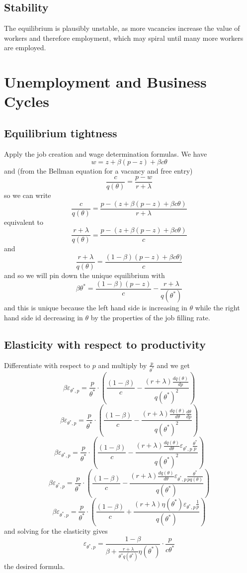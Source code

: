 \documentclass[11pt]{amsart}
\begin{document}
\subsection{Stability}

The equilibrium is plausibly unstable, as more vacancies increase the value of workers and therefore employment, which may spiral until many more workers are employed.

\section{Unemployment and Business Cycles}

\subsection{Equilibrium tightness}

Apply the job creation and wage determination formulas.
We have
\[
w = z + \beta (p-z) + \beta c \theta
\]
and (from the Bellman equation for a vacancy and free entry)
\[
\frac{c}{q(\theta)} = \frac{p - w}{r + \lambda}
\]
so we can write 
\[
\frac{c}{q(\theta)} = \frac{p - (z + \beta (p-z) + \beta c \theta)}{r + \lambda}
\]
equivalent to 
\[
\frac{r + \lambda}{q(\theta)} = \frac{p - (z + \beta (p-z) + \beta c \theta)}{c}
\]
and
\[
\frac{r + \lambda}{q(\theta)} = \frac{(1-\beta)(p-z) + \beta c \theta)}{c}
\]
and so we will pin down the unique equilibrium with
\[
\beta \theta^* = \frac{(1-\beta)(p-z)}{c} - \frac{r + \lambda}{q(\theta^*)}
\]
and this is unique because the left hand side is increasing in $\theta$ while the right hand side id decreasing in $\theta$ by the properties of the job filling rate. 

\subsection{Elasticity with respect to productivity}

Differentiate with respect to $p$ and multiply by $\frac{p}{\theta^*}$ and we get
\[
\beta \varepsilon_{\theta^*, p} = \frac{p}{\theta^*} \cdot \left(\frac{(1-\beta)}{c} - \frac{(r + \lambda) \frac{dq(\theta)}{dp}}{q(\theta^*)^2} \right)
\]
\[
\beta \varepsilon_{\theta^*, p} = \frac{p}{\theta^*} \cdot \left(\frac{(1-\beta)}{c} - \frac{(r + \lambda) \frac{dq(\theta)}{d\theta} \frac{d\theta}{dp}}{q(\theta^*)^2} \right)
\]
\[
\beta \varepsilon_{\theta^*, p} = \frac{p}{\theta^*} \cdot \left(\frac{(1-\beta)}{c} - \frac{(r + \lambda) \frac{dq(\theta)}{d\theta} \varepsilon_{\theta^*, p} \frac{\theta^*}{p} }{q(\theta^*)^2} \right)
\]
\[
\beta \varepsilon_{\theta^*, p} = \frac{p}{\theta^*} \cdot \left(\frac{(1-\beta)}{c} - \frac{(r + \lambda) \frac{dq(\theta)}{d\theta} \varepsilon_{\theta^*, p} \frac{\theta^*}{pq(\theta)} }{q(\theta^*)} \right)
\]
\[
\beta \varepsilon_{\theta^*, p} = \frac{p}{\theta^*} \cdot \left(\frac{(1-\beta)}{c} + \frac{(r + \lambda) \eta(\theta^*) \varepsilon_{\theta^*, p} \frac{1}{p} }{q(\theta^*)} \right)
\]
and solving for the elasticity gives
\[
\varepsilon_{\theta^*, p} = \frac{1-\beta}{\beta + \frac{r+\lambda}{\theta^* q(\theta^*)} \eta(\theta^*)} \cdot \frac{p}{c\theta^*}
\]
the desired formula.
\end{document}
